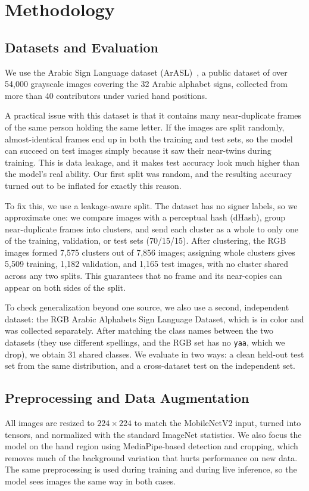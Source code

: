 \section{Methodology}

\subsection{Datasets and Evaluation}
We use the Arabic Sign Language dataset (ArASL)~\cite{latif2020arsl}, a public
dataset of over 54{,}000 grayscale images covering the 32 Arabic alphabet signs,
collected from more than 40 contributors under varied hand positions.

A practical issue with this dataset is that it contains many near-duplicate frames
of the same person holding the same letter. If the images are split randomly,
almost-identical frames end up in both the training and test sets, so the model can
succeed on test images simply because it saw their near-twins during training. This
is data leakage, and it makes test accuracy look much higher than the model's real
ability. Our first split was random, and the resulting accuracy turned out to be
inflated for exactly this reason.

To fix this, we use a leakage-aware split. The dataset has no signer labels, so we
approximate one: we compare images with a perceptual hash (dHash), group
near-duplicate frames into clusters, and send each cluster as a whole to only one of
the training, validation, or test sets (70/15/15). After clustering, the RGB images
formed 7{,}575 clusters out of 7{,}856 images; assigning whole clusters gives
5{,}509 training, 1{,}182 validation, and 1{,}165 test images, with no cluster
shared across any two splits. This guarantees that no frame and its near-copies can
appear on both sides of the split.

To check generalization beyond one source, we also use a second, independent
dataset: the RGB Arabic Alphabets Sign Language Dataset, which is in color and was
collected separately. After matching the class names between the two datasets (they
use different spellings, and the RGB set has no \texttt{yaa}, which we drop), we
obtain 31 shared classes. We evaluate in two ways: a clean held-out test set from
the same distribution, and a cross-dataset test on the independent set.

\subsection{Preprocessing and Data Augmentation}
All images are resized to $224 \times 224$ to match the MobileNetV2 input, turned
into tensors, and normalized with the standard ImageNet statistics. We also focus
the model on the hand region using MediaPipe-based detection and cropping, which
removes much of the background variation that hurts performance on new data. The
same preprocessing is used during training and during live inference, so the model
sees images the same way in both cases.

